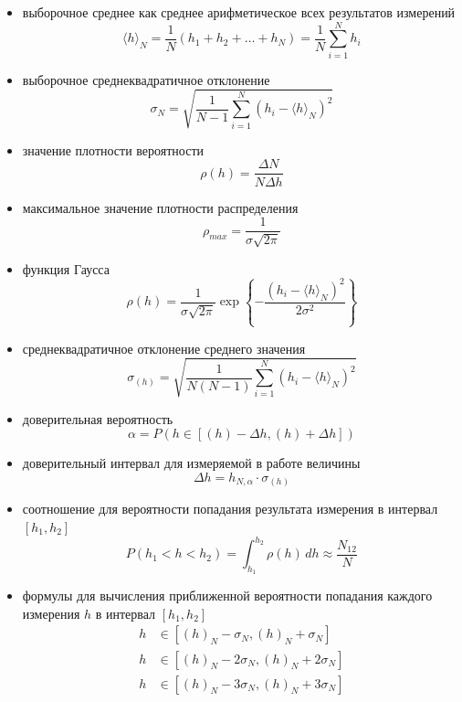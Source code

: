 \documentclass[a4paper,12pt]{article}
\begin{document}
\begin{itemize}
    \item выборочное среднее как среднее арифметическое всех результатов измерений
    \[
    \langle h \rangle_N = \frac{1}{N}(h_1 + h_2 + \dots + h_N) = \frac{1}{N}\sum_{i=1}^N h_i
    \]

    \item выборочное среднеквадратичное отклонение
    \[
    \sigma_N = \sqrt{\frac{1}{N-1}\sum_{i=1}^N (h_i - \langle h \rangle_N)^2}
    \]

    \item значение плотности вероятности
    \[
    \rho(h) = \frac{\Delta N}{N \Delta h}
    \]

    \item максимальное значение плотности распределения
    \[
    \rho_{max} = \frac{1}{\sigma\sqrt{2\pi}}
    \]

    \item функция Гаусса
    \[
    \rho(h) = \frac{1}{\sigma\sqrt{2\pi}}\exp\left\{-\frac{(h_i - \langle h \rangle_N)^2}{2\sigma^2}\right\}
    \]

    \item среднеквадратичное отклонение среднего значения
    \[
    \sigma_{(h)} = \sqrt{\frac{1}{N(N-1)}\sum_{i=1}^N (h_i - \langle h \rangle_N)^2}
    \]

    \item доверительная вероятность
    \[
    \alpha = P(h \in [(h) - \Delta h, (h) + \Delta h])
    \]

    \item доверительный интервал для измеряемой в работе величины
    \[
    \Delta h = h_{N,\alpha} \cdot \sigma_{(h)}
    \]

    \item соотношение для вероятности попадания результата измерения в интервал \([h_1, h_2]\)
    \[
    P(h_1 < h < h_2) = \int_{h_1}^{h_2} \rho(h) \, dh \approx \frac{N_{12}}{N}
    \]

    \item формулы для вычисления приближенной вероятности попадания каждого измерения \(h\) в интервал \([h_1, h_2]\)
    \begin{align*}
        h &\in [(h)_N - \sigma_N, (h)_N + \sigma_N] \\
        h &\in [(h)_N - 2\sigma_N, (h)_N + 2\sigma_N] \\
        h &\in [(h)_N - 3\sigma_N, (h)_N + 3\sigma_N]
    \end{align*}


\end{itemize}
\end{document}
